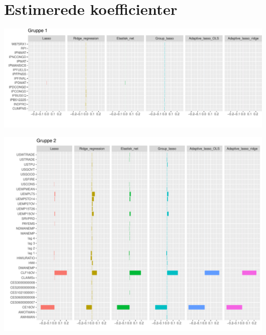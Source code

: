 \chapter{Estimerede koefficienter}

\begin{landscape}
        \includegraphics[scale=0.75, clip, trim=0 0.8cm 0 0]{fig/img/coef_gr1.pdf}
\end{landscape}
\begin{landscape}
        \includegraphics[scale=0.75]{fig/img/coef_gr2.pdf}
\end{landscape}

